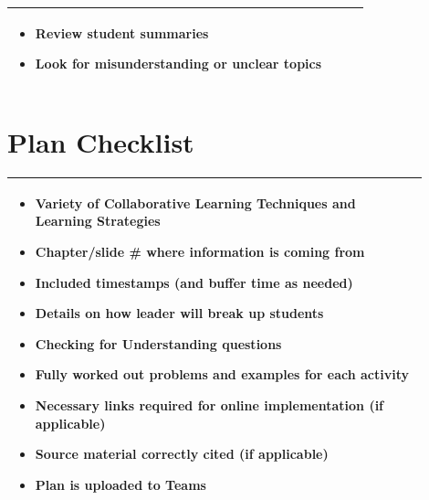 \documentclass{article}
\begin{document}
\begin{tabular}{|p{0.9\linewidth}|}
\hline
\begin{itemize}
    \item Review student summaries
    \item Look for misunderstanding or unclear topics
\end{itemize}
\\ \hline
\end{tabular}
\newpage
\section*{Plan Checklist}

\begin{tabular}{|p{0.9\linewidth}|}
\hline
\begin{itemize}
\item[$\Box$] Variety of Collaborative Learning Techniques and Learning Strategies
\item[$\Box$] Chapter/slide \# where information is coming from
\item[$\Box$] Included timestamps (and buffer time as needed)
\item[$\Box$] Details on how leader will break up students
\item[$\Box$] Checking for Understanding questions
\item[$\Box$] Fully worked out problems and examples for each activity
\item[$\Box$] Necessary links required for online implementation (if applicable)
\item[$\Box$] Source material correctly cited (if applicable)
\item[$\Box$] Plan is uploaded to Teams
\end{itemize}
\\ \hline
\end{tabular}
\newpage
\end{document}
